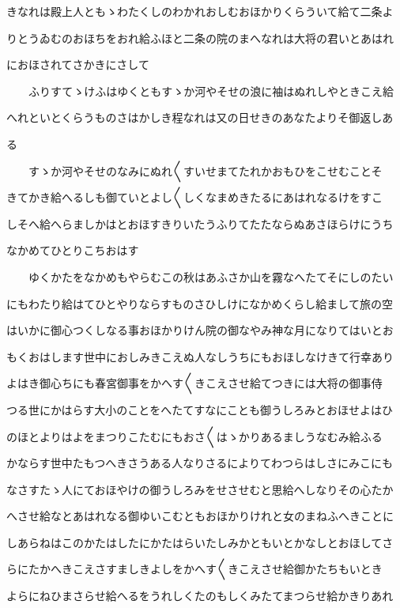 \documentclass[a4paper,11pt,landscape]{ltjtarticle}
\begin{document}
きなれは殿上人ともゝわたくしのわかれおしむおほかりくらういて給て二条よ
\par\medskip
りとうゐむのおほちをおれ給ふほと二条の院のまへなれは大将の君いとあはれ
\par\medskip
におほされてさかきにさして
\par\medskip
　　ふりすてゝけふはゆくともすゝか河やそせの浪に袖はぬれしやときこえ給
\par\medskip
へれといとくらうものさはかしき程なれは又の日せきのあなたよりそ御返しあ
\par\medskip
る
\par\medskip
　　すゝか河やそせのなみにぬれ〱すいせまてたれかおもひをこせむことそ
\par\medskip
きてかき給へるしも御ていとよし〱しくなまめきたるにあはれなるけをすこ
\par\medskip
しそへ給へらましかはとおほすきりいたうふりてたたならぬあさほらけにうち
\par\medskip
なかめてひとりこちおはす
\par\medskip
　　ゆくかたをなかめもやらむこの秋はあふさか山を霧なへたてそにしのたい
\par\medskip
にもわたり給はてひとやりならすものさひしけになかめくらし給まして旅の空
\par\medskip
はいかに御心つくしなる事おほかりけん院の御なやみ神な月になりてはいとお
\par\medskip
もくおはします世中におしみきこえぬ人なしうちにもおほしなけきて行幸あり
\par\medskip
よはき御心ちにも春宮御事をかへす〱きこえさせ給てつきには大将の御事侍
\par\medskip
つる世にかはらす大小のことをへたてすなにことも御うしろみとおほせよはひ
\par\medskip
のほとよりはよをまつりこたむにもおさ〱はゝかりあるましうなむみ給ふる
\par\medskip
かならす世中たもつへきさうある人なりさるによりてわつらはしさにみこにも
\par\medskip
なさすたゝ人にておほやけの御うしろみをせさせむと思給へしなりその心たか
\par\medskip
へさせ給なとあはれなる御ゆいこむともおほかりけれと女のまねふへきことに
\par\medskip
しあらねはこのかたはしたにかたはらいたしみかともいとかなしとおほしてさ
\par\medskip
らにたかへきこえさすましきよしをかへす〱きこえさせ給御かたちもいとき
\par\medskip
よらにねひまさらせ給へるをうれしくたのもしくみたてまつらせ給かきりあれ
\end{document}
